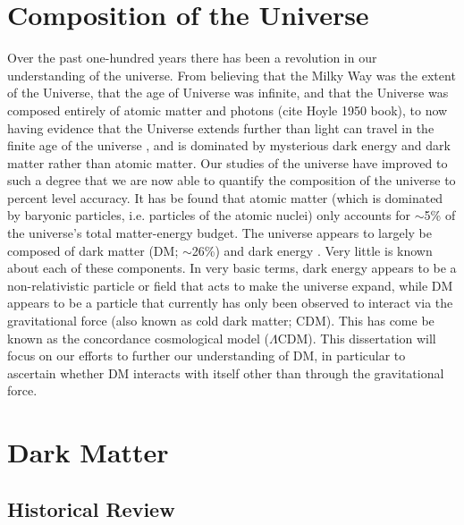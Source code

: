 \label{chapter:1}

\section{Composition of the Universe}\label{section:CompositionOfTheUniverse}

Over the past one-hundred years there has been a revolution in our understanding of the universe.
From believing that the Milky Way was the extent of the Universe, that the age of Universe was infinite, and that the Universe was composed entirely of atomic matter and photons (cite Hoyle 1950 book),
to now having evidence that the Universe extends further than light can travel in the finite age of the universe \citep[$13.817\pm0.048$\,Gyr;][]{Collaboration:2013uv}, and is dominated by mysterious dark energy and dark matter rather than atomic matter.
Our studies of the universe have improved to such a degree that we are now able to quantify the composition of the universe to percent level accuracy. 
It has be found that atomic matter (which is dominated by baryonic particles, i.e. particles of the atomic nuclei) only accounts for $\sim$5\% of the universe's total matter-energy budget.
The universe appears to largely be composed of dark matter (DM; $\sim$26\%) and dark energy \citep[$\sim$69\%; see][for more accurate values]{Collaboration:2013uv}.
Very little is known about each of these components.
In very basic terms, dark energy appears to be a non-relativistic particle or field that acts to make the universe expand, while DM appears to be a particle that currently has only been observed to interact via the gravitational force (also known as cold dark matter; CDM).
This has come be known as the concordance cosmological model ($\Lambda$CDM).
This dissertation will focus on our efforts to further our understanding of DM, in particular to ascertain whether DM interacts with itself other than through the gravitational force.

\section{Dark Matter}

\subsection{Historical Review}\label{section:DMhistory}

